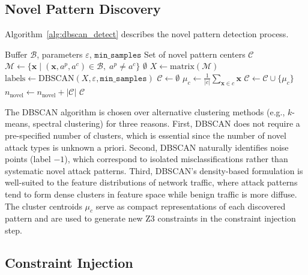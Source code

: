 \documentclass[12pt, letterpaper, oneside]{report}
\newcommand{\bx}{\mathbf{x}}
\begin{document}
\subsection{Novel Pattern Discovery}

Algorithm~\ref{alg:dbscan_detect} describes the novel pattern detection process.

\begin{algorithm}[htbp]
\caption{DBSCAN Novel Attack Pattern Detection}
\label{alg:dbscan_detect}
\begin{algorithmic}[1]
\Require Buffer $\mathcal{B}$, parameters $\varepsilon$, $\texttt{min\_samples}$
\Ensure Set of novel pattern centers $\mathcal{C}$
\State $\mathcal{M} \leftarrow \{\bx \mid (\bx, a^p, a^c) \in \mathcal{B}, \; a^p \neq a^c\}$ 
    \State \Return $\emptyset$
\EndIf
\State $X \leftarrow \text{matrix}(\mathcal{M})$
\State $\text{labels} \leftarrow \text{DBSCAN}(X, \varepsilon, \texttt{min\_samples})$
\State $\mathcal{C} \leftarrow \emptyset$
    \State $\mu_c \leftarrow \frac{1}{|c|} \sum_{\bx \in c} \bx$ 
    \State $\mathcal{C} \leftarrow \mathcal{C} \cup \{\mu_c\}$
\EndFor
\State $n_{\text{novel}} \leftarrow n_{\text{novel}} + |\mathcal{C}|$
\State \Return $\mathcal{C}$
\end{algorithmic}
\end{algorithm}

\noindent The DBSCAN algorithm is chosen over alternative clustering methods (e.g., $k$-means, spectral clustering) for three reasons. First, DBSCAN does not require a pre-specified number of clusters, which is essential since the number of novel attack types is unknown a priori. Second, DBSCAN naturally identifies noise points (label $-1$), which correspond to isolated misclassifications rather than systematic novel attack patterns. Third, DBSCAN's density-based formulation is well-suited to the feature distributions of network traffic, where attack patterns tend to form dense clusters in feature space while benign traffic is more diffuse. The cluster centroids $\mu_c$ serve as compact representations of each discovered pattern and are used to generate new Z3 constraints in the constraint injection step.

\subsection{Constraint Injection}
\end{document}
